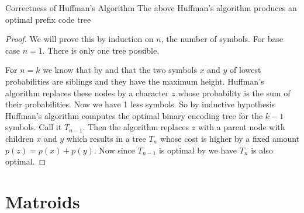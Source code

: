 \begin{Theorem}{Correctness of Huffman's Algorithm}{}
	The above Huffman's algorithm produces an optimal prefix code tree
\end{Theorem}
\begin{proof}
	We will prove this by induction on $n$, the number of symbols. For base case $n=1$. There is only one tree possible.
	
	For $n=k$ we know that by  and  that the two symbols $x$ and $y$ of lowest probabilities are siblings and they have the maximum height. Huffman's algorithm replaces these nodes by a character $z$ whose probability is the sum of their probabilities. Now we have 1 less symbols. So by inductive hypothesis Huffman's algorithm computes the optimal binary encoding tree for the $k-1$ symbols. Call it $T_{n-1}$. Then the algorithm replaces $z$ with a parent node with children $x$ and $y$ which results in a tree $T_n$ whose cost is higher by a fixed amount $p(z)=p(x)+p(y)$. Now since $T_{n-1}$ is optimal by  we have $T_n$ is also optimal.
\end{proof}
\section{Matroids}